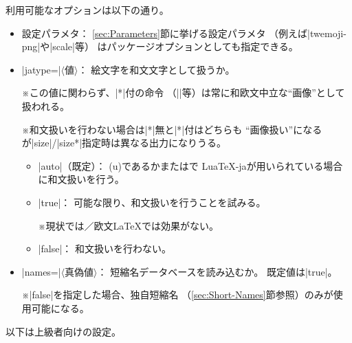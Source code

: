 \documentclass[a4paper]{ltjsarticle}
\renewcommand{\headfont}{\romanseries{sbc}\sffamily}
\newcommand{\Pkg}[1]{\textsf{#1}}
\newcommand{\Meta}[1]{$\langle$\mbox{}#1\mbox{}$\rangle$}
\newcommand{\Note}{\par\noindent ※}
\newcommand{\Means}{：\quad}
\newcommand{\／}{\mbox{}／\mbox{}}
\providecommand{\Strong}[1]{{\headfont#1}}
\begin{document}
利用可能なオプションは以下の通り。

\begin{itemize}
\item \Strong{設定パラメタ}\Means
  \ref{sec:Parameters}節に挙げる設定パラメタ
  （例えば|twemoji-png|や|scale|等）
  はパッケージオプションとしても指定できる。

\item |jatype=|\Meta{値}\Means
  絵文字を和文文字として扱うか。
  \Note この値に関わらず、|*|付の命令
  （||等）は常に和欧文中立な“画像”として扱われる。
  \Note 和文扱いを行わない場合は|*|無と|*|付はどちらも
  “画像扱い”になるが|size|/|size*|指定時は異なる出力になりうる。
  \begin{itemize}
  \item |auto|（既定）\Means
    (u){\pLaTeX}であるかまたは{\LuaLaTeX}で
    \Pkg{LuaTeX-ja}が用いられている場合に和文扱いを行う。
  \item |true|\Means
    可能な限り、和文扱いを行うことを試みる。
    \Note 現状では{\pdfLaTeX}\／{}欧文{\LaTeX}では効果がない。
  \item |false|\Means
    和文扱いを行わない。
  \end{itemize}

\item |names=|\Meta{真偽値}\Means
  短縮名データベースを読み込むか。
  既定値は|true|。
  \Note |false|を指定した場合、独自短縮名
  （\ref{sec:Short-Names}節参照）のみが使用可能になる。
\end{itemize}

以下は上級者向けの設定。
\end{document}
